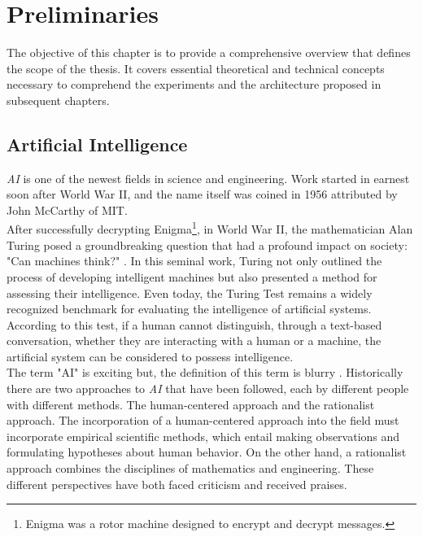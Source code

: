 \chapter{Preliminaries}
\label{cap:prelim}

The objective of this chapter is to provide a comprehensive overview that
defines the scope of the thesis. It covers essential theoretical and technical
concepts necessary to comprehend the experiments and the architecture proposed
in subsequent chapters.

\section{Artificial Intelligence}

\textit{AI} is one of the newest fields in science and engineering. Work
started in earnest soon after World War II, and the name itself was coined in
1956 attributed by John McCarthy of MIT. \\

After successfully decrypting Enigma\footnote{Enigma was a rotor machine
designed to encrypt and decrypt messages.}, in World War II, the mathematician
Alan Turing posed a groundbreaking question that had a profound impact on
society: "Can machines think?" \cite{CanMachineThink}. In this seminal work,
Turing not only outlined the process of developing intelligent machines but
also presented a method for assessing their intelligence. Even today, the
Turing Test remains a widely recognized benchmark for evaluating the
intelligence of artificial systems. According to this test, if a human cannot
distinguish, through a text-based conversation, whether they are interacting
with a human or a machine, the artificial system can be considered to possess
intelligence. \\

The term "AI" is exciting but, the definition of this term is blurry
\cite{AIModernApprouch}. Historically there are two approaches to \textit{AI}
that have been followed, each by different people with different methods. The
human-centered approach and the rationalist approach. The incorporation of a
human-centered approach into the field must incorporate empirical scientific
methods, which entail making observations and formulating hypotheses about
human behavior. On the other hand, a rationalist approach combines the
disciplines of mathematics and engineering. These different perspectives have
both faced criticism and received praises. \\

